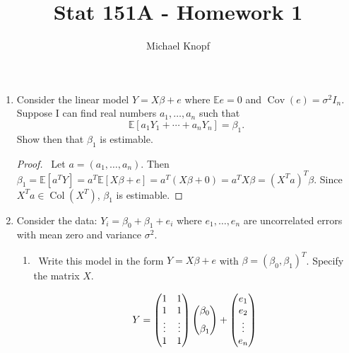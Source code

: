 \documentclass[12pt]{article}
\newcommand{\E}{\mathbb{E}}
\DeclareMathOperator*{\Cov}{Cov}
\DeclareMathOperator*{\Col}{Col}
\begin{document}
 


\title{Stat 151A - Homework 1}
\author{Michael Knopf}
 
\maketitle


\begin{enumerate}[leftmargin=0cm,itemindent=.5cm,labelwidth=\itemindent,labelsep=0cm,align=left]
\item Consider the linear model $Y = X\beta + e$ where $\E e = 0$ and $\Cov(e) = \sigma^2 I_n$.  Suppose I can find real numbers $a_1, \dots, a_n$ such that $$\E[a_1Y_1 + \cdots + a_nY_n] = \beta_1.$$  Show then that $\beta_1$ is estimable.

\begin{proof}

\ Let $a = (a_1, \dots , a_n)$.  Then $\beta_1 = \E[a^T Y] = a^T \E[X\beta + e] = a^T (X\beta + 0) = a^T X \beta = (X^T a)^T \beta$.  Since $X^Ta \in \Col(X^T)$, $\beta_1$ is estimable.

\end{proof}

\item Consider the data: $Y_i = \beta_0 + \beta_1 + e_i$ where $e_1, \dots, e_n$ are uncorrelated errors with mean zero and variance $\sigma^2$.
\begin{enumerate}
\item \ Write this model in the form $Y = X\beta + e$ with $\beta = (\beta_0, \beta_1)^T$.  Specify the matrix $X$.

$$Y = \begin{pmatrix}
1 & 1 \\ 
1 & 1 \\ 
\vdots & \vdots \\ 
1 & 1
\end{pmatrix}
\begin{pmatrix}
\beta_0 \\ 
\beta_1 \vphantom{\vdots}
\end{pmatrix}
+ 
\begin{pmatrix}
e_1 \\
e_2 \\
\vdots \\
e_n
\end{pmatrix}
$$


\end{enumerate}
\end{enumerate}
\end{document}
